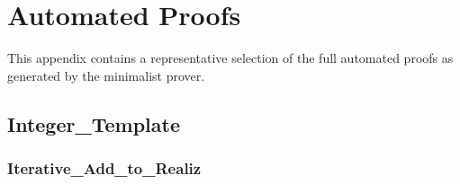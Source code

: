

\section{Automated Proofs\label{apx:proofs}}

This appendix contains a representative selection of the full automated proofs as generated by the minimalist prover.

	\subsection{Integer\_Template}	%

		\subsubsection{Iterative\_Add\_to\_Realiz}	%

